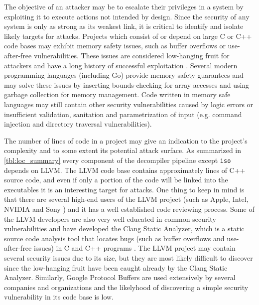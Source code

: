 The objective of an attacker may be to escalate their privileges in a system by exploiting it to execute actions not intended by design. Since the security of any system is only as strong as its weakest link, it is critical to identify and isolate likely targets for attacks. Projects which consist of or depend on large C or C++ code bases may exhibit memory safety issues, such as buffer overflows or use-after-free vulnerabilities. These issues are considered low-hanging fruit for attackers and have a long history of successful exploitation \cite{for_fun_and_profit}. Several modern programming languages (including Go) provide memory safety guarantees and may solve these issues by inserting bounds-checking for array accesses and using garbage collection for memory management. Code written in memory safe languages may still contain other security vulnerabilities caused by logic errors or insufficient validation, sanitation and parametrization of input (e.g. command injection and directory traversal vulnerabilities).

The number of lines of code in a project may give an indication to the project's complexity and to some extent its potential attack surface. As summarized in \cref{tbl:loc_summary} every component of the decompiler pipeline except \texttt{iso} depends on LLVM. The LLVM code base contains approximately  lines of C++ source code, and even if only a portion of the code will be linked into the executables it is an interesting target for attacks. One thing to keep in mind is that there are several high-end users of the LLVM project (such as Apple, Intel, NVIDIA and Sony \cite{llvm_users}) and it has a well established code reviewing process. Some of the LLVM developers are also very well educated in common security vulnerabilities and have developed the Clang Static Analyzer, which is a static source code analysis tool that locates bugs (such as buffer overflows and use-after-free issues) in C and C++ programs \cite{clang_analyzer}. The LLVM project may contain several security issues due to its size, but they are most likely difficult to discover since the low-hanging fruit have been caught already by the Clang Static Analyzer. Similarly, Google Protocol Buffers are used extensively by several companies and organizations and the likelyhood of discovering a simple security vulnerability in its code base is low.

